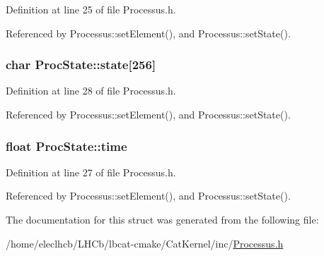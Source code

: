 Definition at line 25 of file Processus.h.

Referenced by Processus::setElement(), and Processus::setState().\hypertarget{structProcState_aaffb70e5af437e2c0d4dfc69bd0b24cd}{
\subsubsection[{state}]{\setlength{\rightskip}{0pt plus 5cm}char {\bf ProcState::state}\mbox{[}256\mbox{]}}}
\label{structProcState_aaffb70e5af437e2c0d4dfc69bd0b24cd}


Definition at line 28 of file Processus.h.

Referenced by Processus::setElement(), and Processus::setState().\hypertarget{structProcState_a88c69b099d8f2b2164d478f28e87610f}{
\subsubsection[{time}]{\setlength{\rightskip}{0pt plus 5cm}float {\bf ProcState::time}}}
\label{structProcState_a88c69b099d8f2b2164d478f28e87610f}


Definition at line 27 of file Processus.h.

Referenced by Processus::setElement(), and Processus::setState().

The documentation for this struct was generated from the following file:\begin{DoxyCompactItemize}
\item 
/home/eleclhcb/LHCb/lbcat-\/cmake/CatKernel/inc/\hyperlink{Processus_8h}{Processus.h}\end{DoxyCompactItemize}
